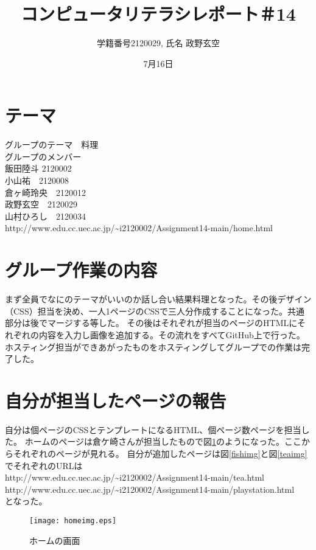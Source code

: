 \documentclass[12pt,a4j]{jarticle}
\begin{document}
\title{コンピュータリテラシレポート＃14}
\author{学籍番号2120029, 氏名 政野玄空}
\date{7月16日}
\maketitle

\section{テーマ}

グループのテーマ　料理\\
グループのメンバー\\
飯田陸斗  2120002\\
小山祐　2120008\\
倉ヶ崎玲央　2120012\\
政野玄空　2120029\\
山村ひろし　2120034\\
http://www.edu.cc.uec.ac.jp/\~{}i2120002/Assignment14-main/home.html\\
\section{グループ作業の内容}
まず全員でなにのテーマがいいのか話し合い結果料理となった。その後デザイン（CSS）担当を決め、一人1ページのCSSで三人分作成することになった。共通部分は後でマージする等した。
その後はそれぞれが担当のページのHTMLにそれぞれの内容を入力し画像を追加する。その流れをすべてGitHub上で行った。
ホスティング担当ができあがったものをホスティングしてグループでの作業は完了した。
\section{自分が担当したページの報告}
自分は個ページのCSSとテンプレートになるHTML、個ページ数ページを担当した。
ホームのページは倉ケ崎さんが担当したもので図\ref{homeimg}のようになった。ここからそれぞれのページが見れる。
自分が追加したページは図\ref{fishimg}と図\ref{teaimg}でそれぞれのURLは\\
http://www.edu.cc.uec.ac.jp/\~{}i2120002/Assignment14-main/tea.html\\
http://www.edu.cc.uec.ac.jp/\~{}i2120002/Assignment14-main/playstation.html\\
となった。

\begin{figure}[htbp]
\begin{center}
\texttt{[image: homeimg.eps]}
\caption{ホームの画面}\label{homeimg}
\end{center}
\end{figure}
\end{document}

